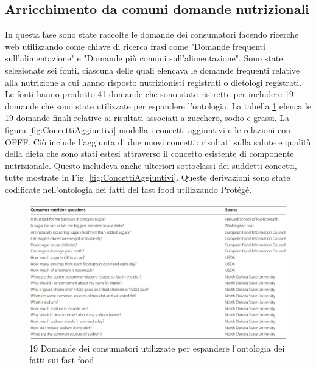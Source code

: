 \subsection{Arricchimento da comuni domande nutrizionali}
In questa fase sono state raccolte le domande dei consumatori facendo ricerche web utilizzando come chiave di ricerca frasi come "Domande frequenti \\sull'alimentazione" e "Domande più comuni sull'alimentazione". Sono state selezionate sei fonti, ciascuna delle quali elencava le domande frequenti relative alla nutrizione a cui hanno risposto nutrizionisti registrati o dietologi registrati. Le fonti hanno prodotto 41 domande che sono state ristrette per includere 19 domande che sono state utilizzate per espandere l'ontologia.
La tabella \ref{fig:Questions} elenca le 19 domande finali relative ai risultati associati a zucchero, sodio e grassi.
La figura \ref{fig:ConcettiAggiuntivi} modella i concetti aggiuntivi e le relazioni con OFFF. Ciò include l'aggiunta di due nuovi concetti: risultati sulla salute e qualità della dieta che sono stati estesi attraverso il concetto esistente di componente nutrizionale.
Questo includeva anche ulteriori sottoclassi dei suddetti concetti, tutte mostrate in Fig. \ref{fig:ConcettiAggiuntivi}. Queste derivazioni sono state codificate nell'ontologia dei fatti del fast food utilizzando Protégé.

\begin{figure}[H]
    \centering
    \includegraphics[width=\textwidth]{res/WS_04_Questions.jpg}
    \caption{19 Domande dei consumatori utilizzate per espandere l'ontologia dei fatti sui fast food}
     \label{fig:Questions}
\end{figure}

